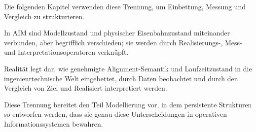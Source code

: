 \noindent
Die folgenden Kapitel verwenden diese Trennung, um Einbettung, Messung und
Vergleich zu strukturieren.

\begin{principle}[Realitätsprinzip]
\label{princ:reality-principle}
In AIM sind Modellzustand und physischer Eisenbahnzustand miteinander
verbunden, aber begrifflich verschieden; sie werden durch Realisierungs-,
Mess- und Interpretationsoperatoren verknüpft.
\end{principle}

\begin{summary}
Realität legt dar, wie genehmigte Alignment-Semantik und Laufzeitzustand in
die ingenieurtechnische Welt eingebettet, durch Daten beobachtet und durch den
Vergleich von Ziel und Realisiert interpretiert werden.
\end{summary}

Diese Trennung bereitet den Teil Modellierung vor, in dem persistente
Strukturen so entworfen werden, dass sie genau diese Unterscheidungen in
operativen Informationssystemen bewahren.
